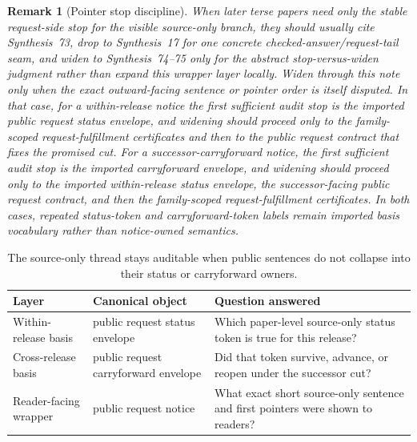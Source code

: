 \documentclass[11pt]{article}
\newtheorem{remark}{Remark}
\begin{document}
\begin{remark}[Pointer stop discipline]
When later terse papers need only the stable request-side stop for the visible source-only branch, they should usually cite Synthesis~73, drop to Synthesis~17 for one concrete checked-answer/request-tail seam, and widen to Synthesis~74--75 only for the abstract stop-versus-widen judgment rather than expand this wrapper layer locally.
Widen through this note only when the exact outward-facing sentence or pointer order is itself disputed. In that case, for a within-release notice the first sufficient audit stop is the imported public request status envelope, and widening should proceed only to the family-scoped request-fulfillment certificates and then to the public request contract that fixes the promised cut.
For a successor-carryforward notice, the first sufficient audit stop is the imported carryforward envelope, and widening should proceed only to the imported within-release status envelope, the successor-facing public request contract, and then the family-scoped request-fulfillment certificates.
In both cases, repeated status-token and carryforward-token labels remain imported basis vocabulary rather than notice-owned semantics.
\end{remark}

\begin{table}[t]
\centering
\small
\begin{tabularx}{\linewidth}{@{}l l X@{}}
\toprule
Layer & Canonical object & Question answered \\
\midrule
Within-release basis & public request status envelope & Which paper-level source-only status token is true for this release? \\
Cross-release basis & public request carryforward envelope & Did that token survive, advance, or reopen under the successor cut? \\
Reader-facing wrapper & public request notice & What exact short source-only sentence and first pointers were shown to readers? \\
\bottomrule
\end{tabularx}
\caption{The source-only thread stays auditable when public sentences do not collapse into their status or carryforward owners.}
\label{tab:publicrequestnotices}
\end{table}
\end{document}
